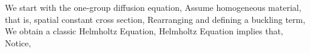 \documentclass{school-22.211-notes}
\date{March 19, 2012}
\begin{document}
\maketitle

 \label{1g-criticality}
We start with the one-group diffusion equation,
Assume homogeneous material, that is, spatial constant cross section,
Rearranging and defining a buckling term, 
We obtain a classic Helmholtz Equation,
Helmholtz Equation implies that,
Notice,
\end{document}
